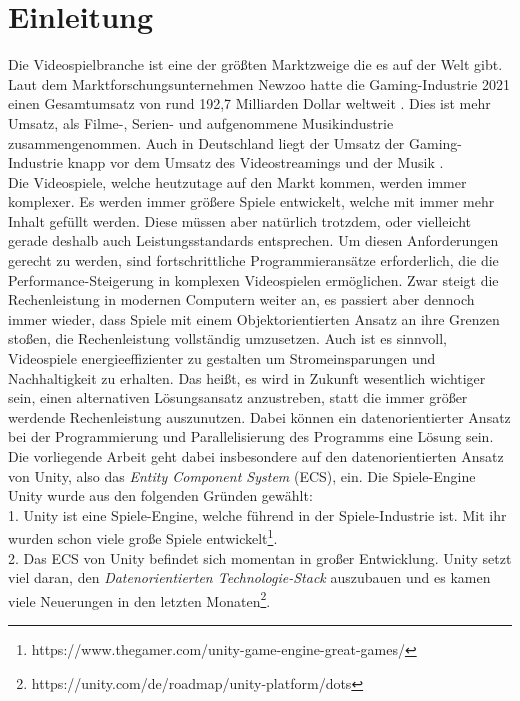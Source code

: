 \section{Einleitung}
Die Videospielbranche ist eine der größten Marktzweige die es auf der Welt gibt. Laut dem Marktforschungsunternehmen Newzoo hatte die Gaming-Industrie 2021 einen Gesamtumsatz von rund 192,7 Milliarden Dollar weltweit \cite{Spiele-Industrie-weltweit}. Dies ist mehr Umsatz, als Filme-, Serien- und aufgenommene Musikindustrie zusammengenommen. Auch in Deutschland liegt der Umsatz der Gaming-Industrie knapp vor dem Umsatz des Videostreamings und der Musik \cite{Spiele-Industrie-deutschland}.\\
Die Videospiele, welche heutzutage auf den Markt kommen, werden immer komplexer. Es werden immer größere Spiele entwickelt, welche mit immer mehr Inhalt gefüllt werden. Diese müssen aber natürlich trotzdem, oder vielleicht gerade deshalb auch Leistungsstandards entsprechen. Um diesen Anforderungen gerecht zu werden, sind fortschrittliche Programmieransätze erforderlich, die die Performance-Steigerung in komplexen Videospielen ermöglichen. Zwar steigt die Rechenleistung in modernen Computern weiter an, es passiert aber dennoch immer wieder, dass Spiele mit einem Objektorientierten Ansatz an ihre Grenzen stoßen, die Rechenleistung vollständig umzusetzen. Auch ist es sinnvoll, Videospiele energieeffizienter zu gestalten um Stromeinsparungen und Nachhaltigkeit zu erhalten. Das heißt, es wird in Zukunft wesentlich wichtiger sein, einen alternativen Lösungsansatz anzustreben, statt die immer größer werdende Rechenleistung auszunutzen. Dabei können ein datenorientierter Ansatz bei der Programmierung und Parallelisierung des Programms eine Lösung sein.\\
Die vorliegende Arbeit geht dabei insbesondere auf den datenorientierten Ansatz von Unity, also das \textit{Entity Component System} (ECS), ein. Die Spiele-Engine Unity wurde aus den folgenden Gründen gewählt:\\
1. Unity ist eine Spiele-Engine, welche führend in der Spiele-Industrie ist. Mit ihr wurden schon viele große Spiele entwickelt\footnote{https://www.thegamer.com/unity-game-engine-great-games/}.\\
2. Das ECS von Unity befindet sich momentan in großer Entwicklung. Unity setzt viel daran, den \textit{Datenorientierten Technologie-Stack} auszubauen und es kamen viele Neuerungen in den letzten Monaten\footnote{https://unity.com/de/roadmap/unity-platform/dots}.